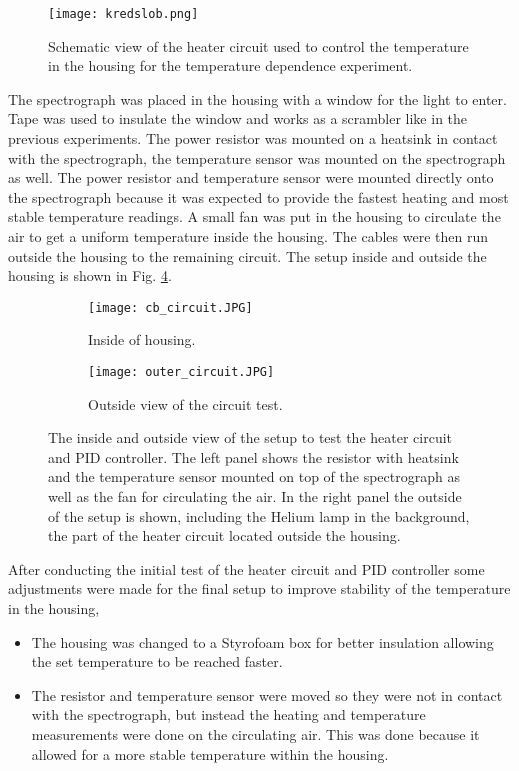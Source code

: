\begin{figure}[h]
\centering
\texttt{[image: kredslob.png]}
\caption{Schematic view of the heater circuit used to control the temperature in the housing for the temperature dependence experiment.}
\label{fig: circuit}
\end{figure}

The spectrograph was placed in the housing with a window for the light to enter. Tape was used to insulate the window and works as a scrambler like in the previous experiments. The power resistor was mounted on a heatsink in contact with the spectrograph, the temperature sensor was mounted on the spectrograph as well. The power resistor and temperature sensor were mounted directly onto the spectrograph because it was expected to provide the fastest heating and most stable temperature readings. A small fan was put in the housing to circulate the air to get a uniform temperature inside the housing. The cables were then run outside the housing to the remaining circuit. The setup inside and outside the housing is shown in Fig. \ref{fig: cardboard}.

\begin{figure}[h!]
\centering
\begin{subfigure}{.5\textwidth}
\centering
\texttt{[image: cb\_circuit.JPG]}
\caption{Inside of housing.}
\label{fig: cd_circuit}
\end{subfigure}%
\begin{subfigure}{.5\textwidth}
\centering
\texttt{[image: outer\_circuit.JPG]}
\caption{Outside view of the circuit test.}
\label{fig: outer_circuit}
\end{subfigure}
\caption{The inside and outside view of the setup to test the heater circuit and PID controller. The left panel shows the resistor with heatsink  and the temperature sensor mounted on top of the spectrograph as well as the fan for circulating the air. In the right panel the outside of the setup is shown, including the Helium lamp in the background, the part of the heater circuit located outside the housing.}
\label{fig: cardboard}
\end{figure}

After conducting the initial test of the heater circuit and PID controller some adjustments were made for the final setup to improve stability of the temperature in the housing,
\begin{itemize}
\item The housing was changed to a Styrofoam box for better insulation allowing the set temperature to be reached faster.
\item The resistor and temperature sensor were moved so they were not in contact with the spectrograph, but instead the heating and temperature measurements were done on the circulating air. This was done because it allowed for a more stable temperature within the housing.
 
\end{itemize}

